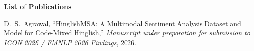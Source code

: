 
\label{page:pub}
\begin{center}
\textbf{\Large List of Publications}
\end{center}
\vspace*{25pt}
\begin{enumerate}[{[1]}]

\item D.~S.~Agrawal, ``HinglishMSA: A Multimodal Sentiment Analysis Dataset and Model for Code-Mixed Hinglish,'' \textit{Manuscript under preparation for submission to ICON 2026 / EMNLP 2026 Findings}, 2026.

\end{enumerate}

\newpage
